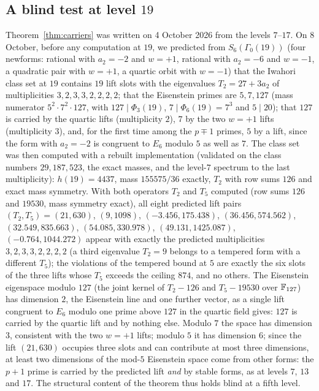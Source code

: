 \documentclass[11pt]{amsart}
\theoremstyle{definition}
\begin{document}
\subsection{A blind test at level $19$}\label{sec:19}
Theorem~\ref{thm:carriers} was written on 4 October 2026 from the levels $7$--$17$. On 8 October, before any computation at $19$, we predicted from $S_6(\Gamma_0(19))$ (four newforms: rational with $a_2=-2$ and $w=+1$, rational with $a_2=-6$ and $w=-1$, a quadratic pair with $w=+1$, a quartic orbit with $w=-1$) that the Iwahori class set at $19$ contains $19$ lift slots with the eigenvalues $T_2=27+3a_2$ of multiplicities $3,2,3,3,2,2,2,2$; that the Eisenstein primes are $5,7,127$ (mass numerator $5^2\cdot7^2\cdot127$, with $127\mid\Phi_3(19)$, $7\mid\Phi_6(19)=7^3$ and $5\mid 20$); that $127$ is carried by the quartic lifts (multiplicity $2$), $7$ by the two $w=+1$ lifts (multiplicity $3$), and, for the first time among the $p\mp1$ primes, $5$ by a lift, since the form with $a_2=-2$ is congruent to $E_6$ modulo $5$ as well as $7$. The class set was then computed with a rebuilt implementation (validated on the class numbers $29,187,523$, the exact masses, and the level-$7$ spectrum to the last multiplicity): $h(19)=4437$, mass $155575/36$ exactly, $T_2$ with row sums $126$ and exact mass symmetry. With both operators $T_2$ and $T_5$ computed (row sums $126$ and $19530$, mass symmetry exact), all eight predicted lift pairs $(T_2,T_5)=(21,630)$, $(9,1098)$, $(-3.456,175.438)$, $(36.456,574.562)$, $(32.549,835.663)$, $(54.085,330.978)$, $(49.131,1425.087)$, $(-0.764,1044.272)$ appear with exactly the predicted multiplicities $3,2,3,3,2,2,2,2$ (a third eigenvalue $T_2=9$ belongs to a tempered form with a different $T_5$); the violations of the tempered bound at $5$ are exactly the six slots of the three lifts whose $T_5$ exceeds the ceiling $874$, and no others. The Eisenstein eigenspace modulo $127$ (the joint kernel of $T_2-126$ and $T_5-19530$ over $\mathbb{F}_{127}$) has dimension $2$, the Eisenstein line and one further vector, as a single lift congruent to $E_6$ modulo one prime above $127$ in the quartic field gives: $127$ is carried by the quartic lift and by nothing else. Modulo $7$ the space has dimension $3$, consistent with the two $w=+1$ lifts; modulo $5$ it has dimension $6$; since the lift $(21,630)$ occupies three slots and can contribute at most three dimensions, at least two dimensions of the mod-$5$ Eisenstein space come from other forms: the $p+1$ prime is carried by the predicted lift \emph{and} by stable forms, as at levels $7$, $13$ and $17$. The structural content of the theorem thus holds blind at a fifth level.
\end{document}

